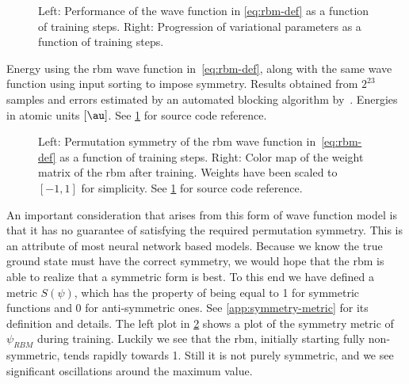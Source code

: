 \documentclass[Thesis.tex]{subfiles}
\begin{document}
\begin{figure}[h]
   \centering
    \resizebox{\linewidth}{!}{%
        
    }
    \caption[Learning progression of an \acrshort{rbm} on quantum dots]{\label{fig:QD-rbm-training}Left: Performance of the
      wave function in \cref{eq:rbm-def} as a function of
      training steps. Right: Progression of variational parameters as a function
      of training steps.}
\end{figure}

\begin{table}[h]
  \centering
  \caption[Energy estimates using an \gls{rbm} on quantum dots]{Energy using the \gls{rbm} wave function in~\cref{eq:rbm-def}, along with
the same wave function using input sorting to impose symmetry. Results obtained
from $2^{23}$ samples and errors estimated by an automated blocking
algorithm by~\textcite{Jonsson-2018}. Energies in atomic units $[\si{\au}]$. See
\cref{fig:QD-rbm-training} for source code reference.}
  
  \label{tab:rbm-energy-results}
\end{table}

\begin{figure}[h]
   \centering
    \resizebox{\linewidth}{!}{%
        
    }
    \caption[Symmetry and weight matrix of an \acrshort{rbm} used on quantum dots]{\label{fig:QD-rbm-symmetry}Left: Permutation symmetry of the \gls{rbm} wave
function in~\cref{eq:rbm-def} as a function of training steps. Right: Color map
of the weight matrix of the \gls{rbm} after training. Weights have been scaled to
$[-1, 1]$ for simplicity. See \cref{fig:QD-rbm-training} for source code reference.}
\end{figure}

An important consideration that arises from this form of wave function model
is that it has no guarantee of satisfying the required permutation symmetry.
This is an attribute of most neural network based models. Because we know the
true ground state must have the correct symmetry, we would hope that the \gls{rbm} is
able to realize that a symmetric form is best. To this end we have defined a
metric $S(\psi)$, which has the property of being equal to 1 for symmetric
functions and $0$ for anti-symmetric ones. See \cref{app:symmetry-metric} for
its definition and details. The left plot in \cref{fig:QD-rbm-symmetry} shows a
plot of the symmetry metric of $\psi_{RBM}$ during training. Luckily we see
that the \gls{rbm}, initially starting fully non-symmetric, tends rapidly towards
1. Still it is not purely symmetric, and we see significant
oscillations around the maximum value.
\end{document}
